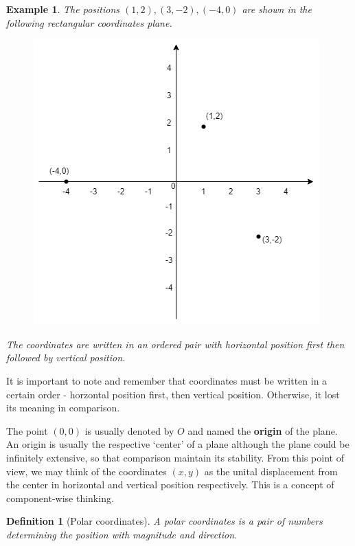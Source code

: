 \documentclass[12pt]{article}
\newtheorem{definition}{Definition}[section]
\newtheorem*{example}{Example}
\begin{document}
    \begin{example}
        The positions $(1,2), (3,-2), (-4,0)$ are shown in the following rectangular coordinates plane.
        
        \begin{figure}[H]
            \centering
            \includegraphics[scale=0.8]{rectangular coordinates.png}
        \end{figure}

        The coordinates are written in an ordered pair with horizontal position first then followed by vertical position.
    \end{example}

    It is important to note and remember that coordinates must be written in a certain order - horzontal position first, then vertical position. Otherwise, it lost its meaning in comparison.

    The point $(0,0)$ is usually denoted by $O$ and named the \textbf{origin} of the plane. An origin is usually the respective `center' of a plane although the plane could be infinitely extensive, so that comparison maintain its stability. From this point of view, we may think of the coordinates $(x,y)$ as the unital displacement from the center in horizontal and vertical position respectively. This is a concept of component-wise thinking.

    \begin{definition}[Polar coordinates]
        A polar coordinates is a pair of numbers determining the position with magnitude and direction. 
    \end{definition}
\end{document}
